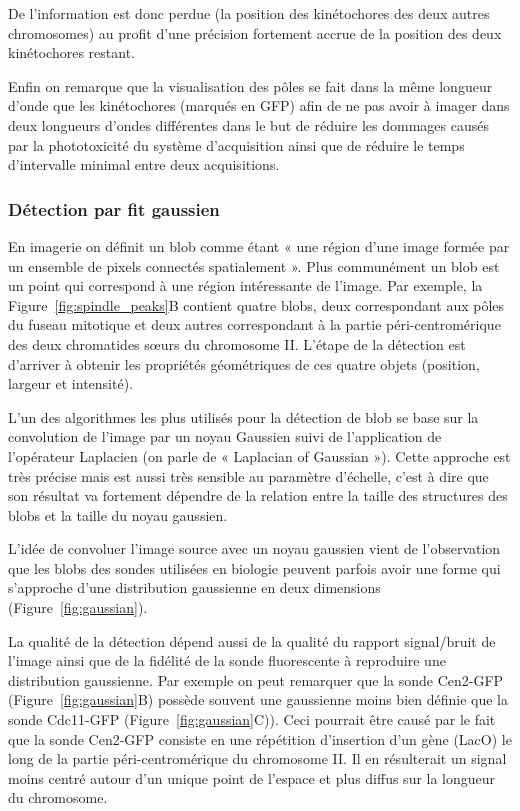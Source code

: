 \documentclass[12pt,a4paper,twoside,openright]{book}
\begin{document}
De l'information est donc perdue (la position des kinétochores des deux
autres chromosomes) au profit d'une précision fortement accrue de la
position des deux kinétochores restant.

Enfin on remarque que la visualisation des pôles se fait dans la même
longueur d'onde que les kinétochores (marqués en GFP) afin de ne pas
avoir à imager dans deux longueurs d'ondes différentes dans le but de
réduire les dommages causés par la phototoxicité du système
d'acquisition ainsi que de réduire le temps d'intervalle minimal entre
deux acquisitions.

\subsubsection{Détection par fit
gaussien}\label{duxe9tection-par-fit-gaussien}

En imagerie on définit un blob comme étant « une région d'une image
formée par un ensemble de pixels connectés spatialement ». Plus
communément un blob est un point qui correspond à une région
intéressante de l'image. Par exemple, la Figure~\ref{fig:spindle_peaks}B
contient quatre blobs, deux correspondant aux pôles du fuseau mitotique
et deux autres correspondant à la partie péri-centromérique des deux
chromatides sœurs du chromosome II. L'étape de la détection est
d'arriver à obtenir les propriétés géométriques de ces quatre objets
(position, largeur et intensité).

L'un des algorithmes les plus utilisés pour la détection de blob se base
sur la convolution de l'image par un noyau Gaussien suivi de
l'application de l'opérateur Laplacien (on parle de « Laplacian of
Gaussian »). Cette approche est très précise mais est aussi très
sensible au paramètre d'échelle, c'est à dire que son résultat va
fortement dépendre de la relation entre la taille des structures des
blobs et la taille du noyau gaussien.

L'idée de convoluer l'image source avec un noyau gaussien vient de
l'observation que les blobs des sondes utilisées en biologie peuvent
parfois avoir une forme qui s'approche d'une distribution gaussienne en
deux dimensions (Figure~\ref{fig:gaussian}).

La qualité de la détection dépend aussi de la qualité du rapport
signal/bruit de l'image ainsi que de la fidélité de la sonde
fluorescente à reproduire une distribution gaussienne. Par exemple on
peut remarquer que la sonde Cen2-GFP (Figure~\ref{fig:gaussian}B)
possède souvent une gaussienne moins bien définie que la sonde Cdc11-GFP
(Figure~\ref{fig:gaussian}C)). Ceci pourrait être causé par le fait que
la sonde Cen2-GFP consiste en une répétition d'insertion d'un gène
(LacO) le long de la partie péri-centromérique du chromosome II. Il en
résulterait un signal moins centré autour d'un unique point de l'espace
et plus diffus sur la longueur du chromosome.
\end{document}

